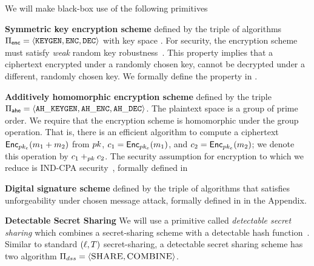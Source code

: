 \NewDocumentCommand{\cciOracle}{g}{%
	\ensuremath{\algNotation{O}_{\IfNoValueTF{#1}{\$}{#1}}}\xspace}
\NewDocumentCommand{\cciLabel}{o}{%
	\textsf{cci\IfNoValueF{#1}{-{#1}}}\xspace}
\NewDocumentCommand{\indcpaRandLabel}{o}{%
	\textsf{ind-cpa\$\IfNoValueF{#1}{-{#1}}}\xspace}


%


We will make black-box use of the following primitives 


\smallskip\noindent\textbf{Symmetric key encryption scheme} defined by the triple of algorithms $\encryptionSchemeDefn$ with key space \encryptKeySpace. For security, the encryption scheme must satisfy \emph{weak} random key robustness~\cite{bhowmick2021apple}. 
 This property implies that a ciphertext encrypted under a randomly chosen key, cannot be decrypted under a different, randomly chosen key.  We formally define the property in . 


\smallskip\noindent\textbf{Additively homomorphic encryption scheme} defined by the triple $\ahencryptionSchemeDefn$.  The plaintext space is a group \group of prime order. We require that the encryption scheme is
homomorphic under the group operation. That is, there is an efficient
algorithm to compute a ciphertext $\pkencrypt[\encryptPubKey](\plaintext[1] \groupOp \plaintext[2])$
from $\pubKey$, $\ciphertext[1] = \pkencrypt[\encryptPubKey](\plaintext[1])$, and $\ciphertext[2] = \pkencrypt[\encryptPubKey](\plaintext[2])$; we denote this operation by
$\ciphertext[1]\homomorphicAdd{\pubKey} \ciphertext[2]$. The security
assumption for encryption to which we reduce is IND-CPA
security~\cite{bellare1998relations}, formally defined in 

\smallskip\noindent\textbf{Digital signature scheme} defined by the triple of algorithms \sigSchemeDefn
that satisfies unforgeability under chosen message attack, formally defined in  in the Appendix. 

\smallskip\noindent\textbf{Detectable Secret Sharing}
%
We will use a primitive called \emph{detectable secret sharing} which combines a secret-sharing scheme with a detectable hash function~\cite{bhowmick2021apple}. Similar to standard $(\ell, T)$ secret-sharing, a detectable secret sharing scheme has two algorithm $\Pi_{dss} = \langle \textsc{SHARE}, \textsc{COMBINE}\rangle$. 

